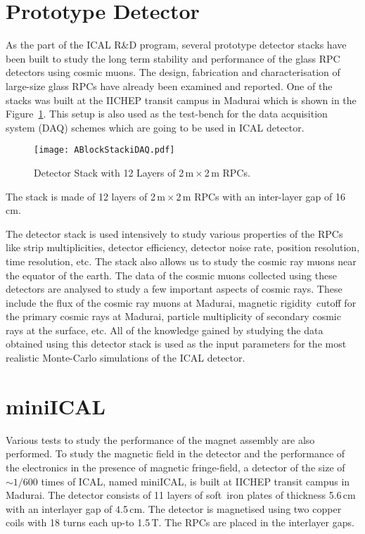 \section{Prototype Detector}
As the part of the ICAL R\&D program, several prototype detector
stacks have been built to study the long term stability and
performance of the glass RPC detectors using cosmic muons. The design,
fabrication and characterisation of large-size glass RPCs have already
been examined and reported\cite{largerpc}. One of the stacks was built
at the IICHEP transit campus in Madurai which is shown in the
Figure~\ref{fig:ablock}. This setup is also used as the test-bench
for the data acquisition system (DAQ) schemes which are going to be
used in ICAL detector.
\begin{figure}[h]
  \centering
  \texttt{[image: ABlockStackiDAQ.pdf]}
  \caption{Detector Stack with 12 Layers of 2\,m\,$\times$\,2\,m RPCs.}
  \label{fig:ablock}
\end{figure}
The stack is made of 12 layers of 2\,m\,$\times$\,2\,m RPCs with an
inter-layer gap of 16\,cm.

The detector stack is used intensively to study various properties of
the RPCs like strip multiplicities, detector efficiency, detector
noise rate, position resolution, time resolution, etc. The stack also
allows us to study the cosmic ray muons near the equator of the earth.
The data of the cosmic muons collected using these detectors are
analysed to study a few important aspects of cosmic rays. These
include the flux of the cosmic ray muons at Madurai\cite{pethu1},
magnetic rigidity~cutoff for the primary cosmic rays at Madurai,
particle multiplicity of secondary cosmic rays at the surface, etc.
All of the knowledge gained
by studying the data obtained using this detector stack is used as the
input parameters for the most realistic Monte-Carlo simulations of the
ICAL detector.

\section{miniICAL}
Various tests to study the performance of the magnet assembly are also
performed. To study the magnetic field in the detector and the
performance of the electronics in the presence of magnetic
fringe-field, a detector of the size of $\sim 1/600$ times of ICAL,
named miniICAL, is built at IICHEP transit campus in Madurai. The
detector consists of 11 layers of soft~iron plates of thickness
5.6\,cm with an interlayer gap of 4.5\,cm. The detector is magnetised
using two copper coils with 18 turns each up-to 1.5\,T. The RPCs are
placed in the interlayer gaps.

